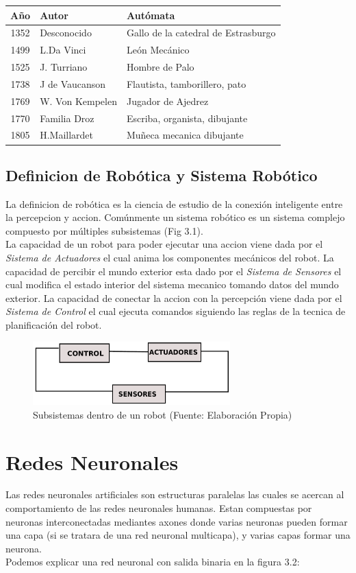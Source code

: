 \begin{tabular}{|c|l|l|}
\hline 
\textbf{A\~no} & \textbf{Auto}r & \textbf{Aut\'omata} \\ 
\hline 
1352 & Desconocido & Gallo de la catedral de Estrasburgo \\ 
\hline 
1499 & L.Da Vinci & Le\'on Mec\'anico \\ 
\hline 
1525 & J. Turriano & Hombre de Palo \\ 
\hline 
1738 & J de Vaucanson & Flautista, tamborillero, pato \\ 
\hline 
1769 & W. Von Kempelen & Jugador de Ajedrez \\ 
\hline 
1770 & Familia Droz & Escriba, organista, dibujante \\ 
\hline 
1805 & H.Maillardet & Mu\~neca mecanica dibujante \\ 
\hline 
\end{tabular}
\subsection{Definicion de Rob\'otica y Sistema Rob\'otico}
La definicion de rob\'otica es la ciencia de estudio de la conexi\'on inteligente entre la percepcion y accion. Com\'unmente un sistema rob\'otico es un sistema complejo compuesto por m\'ultiples subsistemas (Fig 3.1). \\
La capacidad de un robot para poder ejecutar una accion viene dada por el \textit{Sistema de Actuadores} el cual anima los componentes mec\'anicos del robot. La capacidad de percibir el mundo exterior esta dado por el \textit{Sistema de Sensores} el cual modifica el estado interior del sistema mecanico tomando datos del mundo exterior. La capacidad de conectar la accion con la percepci\'on viene dada por el \textit{Sistema de Control} el cual ejecuta comandos siguiendo las reglas de la tecnica de planificaci\'on del robot.\cite{lib_rob2}
\begin{figure}
\centering
\includegraphics[width=3.0in]{imagen3.pdf}
\caption{Subsistemas dentro de un robot (Fuente: Elaboraci\'on Propia)}
\label{fig_mar}
\end{figure}

 \section{Redes Neuronales}
 Las redes neuronales artificiales son estructuras paralelas las cuales se acercan al comportamiento de las redes neuronales humanas. Estan compuestas por neuronas  interconectadas mediantes axones donde varias neuronas pueden formar una capa (si se tratara de una red neuronal multicapa), y varias capas formar una neurona.\\
 Podemos explicar una red neuronal con salida binaria en la figura 3.2:\\
 
